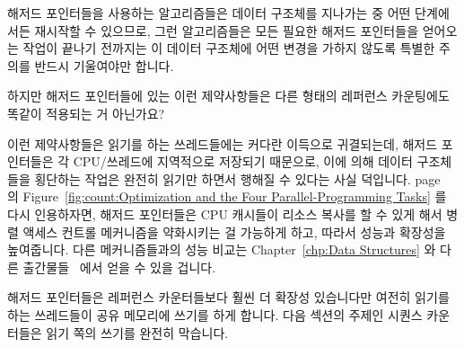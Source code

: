 해저드 포인터들을 사용하는 알고리즘들은 데이터 구조체를 지나가는 중 어떤
단계에서든 재시작할 수 있으므로, 그런 알고리즘들은 모든 필요한 해저드
포인터들을 얻어오는 작업이 끝나기 전까지는 이 데이터 구조체에 어떤 변경을
가하지 않도록 특별한 주의를 반드시 기울여야만 합니다.

\QuickQuiz{}
	하지만 해저드 포인터들에 있는 이런 제약사항들은 다른 형태의 레퍼런스
	카운팅에도 똑같이 적용되는 거 아닌가요?

\QuickQuizAnswer{
	이런 제약사항은 레퍼런스 획득이 실패할 수 있는 레퍼런스 카운팅
	메커니즘들에만 적용됩니다.

} \QuickQuizEnd

이런 제약사항들은 읽기를 하는 쓰레드들에는 커다란 이득으로 귀결되는데, 해저드
포인터들은 각 CPU/쓰레드에 지역적으로 저장되기 때문으로, 이에 의해 데이터
구조체들을 횡단하는 작업은 완전히 읽기만 하면서 행해질 수 있다는 사실 덕입니다.
page~\pageref{fig:count:Optimization and the Four Parallel-Programming Tasks}
의
Figure~\ref{fig:count:Optimization and the Four Parallel-Programming Tasks}
를 다시 인용하자면, 해저드 포인터들은 CPU 캐시들이 리소스 복사를 할 수 있게
해서 병렬 액세스 컨트롤 메커니즘을 약화시키는 걸 가능하게 하고, 따라서 성능과
확장성을 높여줍니다.
다른 메커니즘들과의 성능 비교는 Chapter~\ref{chp:Data Structures} 와 다른
출간물들~\cite{ThomasEHart2007a,McKenney:2013:SDS:2483852.2483867,MagedMichael04a}
에서 얻을 수 있을 겁니다.

해저드 포인터들은 레퍼런스 카운터들보다 훨씬 더 확장성 있습니다만 여전히 읽기를
하는 쓰레드들이 공유 메모리에 쓰기를 하게 합니다.
다음 섹션의 주제인 시퀀스 카운터들은 읽기 쪽의 쓰기를 완전히 막습니다.

